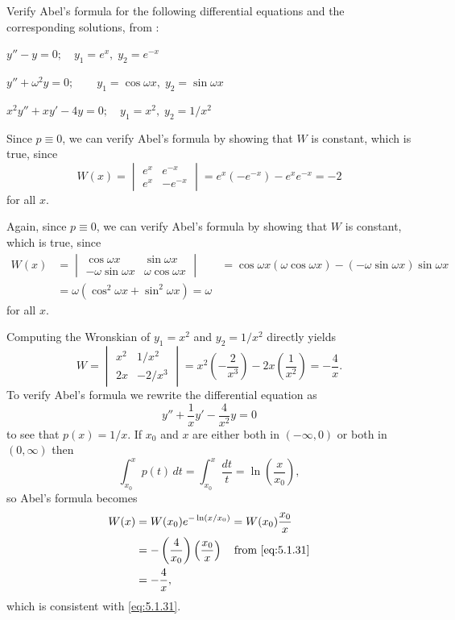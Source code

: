 \begin{example}\label{example:5.1.5}
Verify Abel's formula for the following differential equations and the
corresponding solutions, from
:
\begin{alist}
\item %
$y''-y=0;\quad  y_1=e^x,\;  y_2=e^{-x}$
\item %
$y''+\omega^2y=0;\quad \quad y_1=\cos\omega x,\;  y_2=\sin\omega x$
\item %
$x^2y''+xy'-4y=0;\quad  y_1=x^2,\;  y_2=1/x^2$
\end{alist}
\end{example}

\begin{alistSolution}
\item Since $p\equiv0$, we can verify Abel's formula
by showing that $W$ is constant, which is true, since
\[
W(x)=\begin{vmatrix}
e^x & e^{-x} \\
e^x & -e^{-x}
\end{vmatrix}
=e^x(-e^{-x})-e^xe^{-x}=-2
\]
for all $x$.

\item Again, since $p\equiv0$, we can verify Abel's
formula
by showing that $W$ is constant, which is true, since
\begin{align*}
W(x)&=\begin{vmatrix}
\cos\omega x & \sin\omega x \\
-\omega\sin\omega x &\omega\cos\omega x
\end{vmatrix}
&=\cos\omega x (\omega\cos\omega x)-(-\omega\sin\omega x)\sin\omega x\\
&=\omega(\cos^2\omega x+\sin^2\omega x)=\omega
\end{align*}
for all $x$.

\item
Computing the Wronskian of $y_1=x^2$ and
$y_2=1/x^2$ directly yields
\begin{equation}\label{eq:5.1.31}
W=\begin{vmatrix}
x^2 & 1/x^2 \\
2x & -2/x^3
\end{vmatrix}
=x^2\left(-\frac{2}{x^3}\right)-2x\left(\frac{1}{x^2}\right)=-\frac{4}{x}.
\end{equation}
To verify Abel's formula we
rewrite the differential  equation as
\[
y''+\frac{1}{x}y'-\frac{4}{x^2}y=0
\]
to see  that $p(x)=1/x$. If $x_0$ and $x$ are either both in
$(-\infty,0)$ or both in $(0,\infty)$ then
\[
\int_{x_0}^x p(t)\,dt=\int_{x_0}^x \frac{dt}{t}=\ln\left(\frac{x}{x_0}\right),
\]
so Abel's formula becomes
\begin{align*}
W(x)&=W(x_0)e^{-\ln(x/x_0)}=W(x_0)\frac{x_0}{x}\\
&=-\left(\frac{4}{x_0}\right)\left(\frac{x_0}{x}\right)\quad\text{from
\eqref{eq:5.1.31}}\\
&=-\frac{4}{x},
\end{align*}
which is consistent with \eqref{eq:5.1.31}.
\end{alistSolution}

